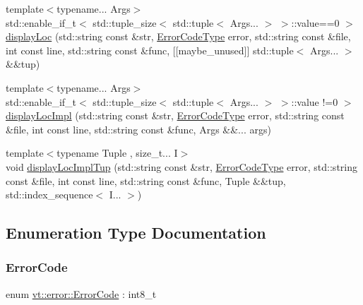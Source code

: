 \begin{DoxyCompactItemize}
\item 
{\footnotesize template$<$typename... Args$>$ }\\std\+::enable\+\_\+if\+\_\+t$<$ std\+::tuple\+\_\+size$<$ std\+::tuple$<$ Args... $>$ $>$\+::value==0 $>$ \hyperlink{namespacevt_1_1error_a31898d4bf9f25ed8f7ae4d71724580fc}{display\+Loc} (std\+::string const \&str, \hyperlink{namespacevt_a793764d753923abc3d32929870beb485}{Error\+Code\+Type} error, std\+::string const \&file, int const line, std\+::string const \&func, \mbox{[}\mbox{[}maybe\+\_\+unused\mbox{]}\mbox{]} std\+::tuple$<$ Args... $>$ \&\&tup)
\item 
{\footnotesize template$<$typename... Args$>$ }\\std\+::enable\+\_\+if\+\_\+t$<$ std\+::tuple\+\_\+size$<$ std\+::tuple$<$ Args... $>$ $>$\+::value !=0 $>$ \hyperlink{namespacevt_1_1error_a72bed290e73b0ff6a5f0c769c14c82f5}{display\+Loc\+Impl} (std\+::string const \&str, \hyperlink{namespacevt_a793764d753923abc3d32929870beb485}{Error\+Code\+Type} error, std\+::string const \&file, int const line, std\+::string const \&func, Args \&\&... args)
\item 
{\footnotesize template$<$typename Tuple , size\+\_\+t... I$>$ }\\void \hyperlink{namespacevt_1_1error_a8ba52013f613050350ba268f0efc3074}{display\+Loc\+Impl\+Tup} (std\+::string const \&str, \hyperlink{namespacevt_a793764d753923abc3d32929870beb485}{Error\+Code\+Type} error, std\+::string const \&file, int const line, std\+::string const \&func, Tuple \&\&tup, std\+::index\+\_\+sequence$<$ I... $>$)
\end{DoxyCompactItemize}


\subsection{Enumeration Type Documentation}
\mbox{\label{namespacevt_1_1error_a2d36cef4c5ee65ddf503f7f4127e1829}} 
\subsubsection{\texorpdfstring{Error\+Code}{ErrorCode}}
{\footnotesize\ttfamily enum \hyperlink{namespacevt_1_1error_a2d36cef4c5ee65ddf503f7f4127e1829}{vt\+::error\+::\+Error\+Code} \+: int8\+\_\+t\hspace{0.3cm}{\ttfamily [strong]}}


